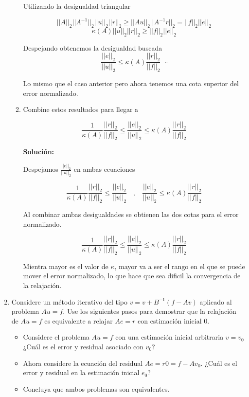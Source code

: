 \documentclass[spanish]{article}
\begin{document}
\begin{enumerate}
\begin{enumerate}
        Utilizando la desigualdad triangular
        
        $$ ||A||_2 ||A^{-1}||_2 ||u||_2  ||r||_2 \geq ||Au||_2 ||A^{-1}r||_2 = ||f||_2 ||e||_2 $$
        $$ \kappa(A) ||u||_2  ||r||_2 \geq ||f||_2 ||e||_2 $$
        
        Despejando obtenemos la desigualdad buscada
         $$\frac{||e||_2}{||u||_2} \leq \kappa(A) \frac{||r||_2}{||f||_2}  \ \ \  \square$$
         
         Lo mismo que el caso anterior pero ahora tenemos una cota superior del error normalizado.
        
        \item Combine estos resultados para llegar a
        
        
        $$ \frac{1}{\kappa(A)} \frac{||r||_2}{||f||_2} \leq \frac{||e||_2}{||u||_2} \leq \kappa(A) \frac{||r||_2}{||f||_2}$$
        
        
        \textbf{Solución:}
 
        Despejamos $\frac{||e||_2}{||u||_2}$ en ambas ecuaciones
        
        $$ \frac{1}{\kappa(A)} \frac{||r||_2}{||f||_2} \leq \frac{||e||_2}{||u||_2} \ \ \ \ , \ \ \ \  \frac{||e||_2}{||u||_2} \leq \kappa(A) \frac{||r||_2}{||f||_2}$$
        
        Al combinar ambas desigualdades se obtienen las dos cotas para el error normalizado.
        
        $$ \frac{1}{\kappa(A)} \frac{||r||_2}{||f||_2} \leq \frac{||e||_2}{||u||_2} \leq \kappa(A) \frac{||r||_2}{||f||_2}$$
        
        Mientra mayor es el valor de $\kappa$, mayor va a ser el rango en el que se puede mover el error normalizado, lo que hace que sea dificil la convergencia de la relajación.
        
        
        \end{enumerate}
      
       \item Considere un método iterativo del tipo $v = v + B^{-1}(f - Av)$ aplicado al problema $Au = f$. Use los siguientes pasos para demostrar que la relajación de $Au = f$ es equivalente a relajar $Ae = r$ con estimación inicial 0.
       
       \begin{itemize}
           \item Considere el problema $Au = f$ con una estimación inicial arbitraria $v = v_0$ ¿Cuál es el error y residual asociado con $v_0$?
            \item Ahora considere la ecuación del residual $Ae = r0 = f - Av_0$. ¿Cuál es el error y residual en la estimación inicial $e_0$?
            \item Concluya que ambos problemas son equivalentes.
       \end{itemize}
       

\end{enumerate}
\end{document}
